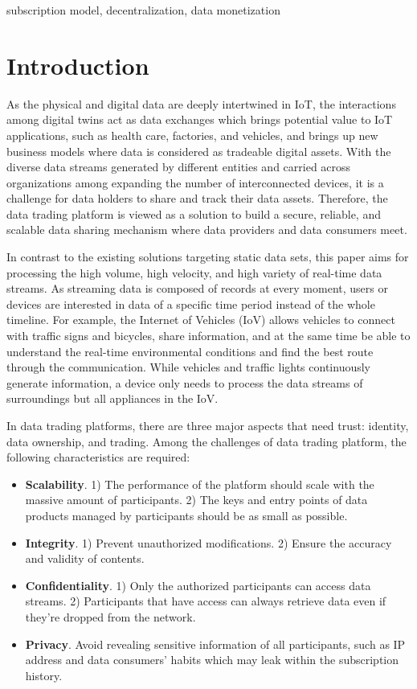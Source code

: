 \documentclass[10pt, conference, compsocconf]{IEEEtran}
\begin{document}
\begin{IEEEkeywords}
subscription model, decentralization, data monetization
\end{IEEEkeywords}

\section{Introduction}
As the physical and digital data are deeply intertwined in IoT, the interactions among digital twins act as data exchanges\cite{digitaltwin} which brings potential value to IoT applications, such as health care, factories, and vehicles, and brings up new business models where data is considered as tradeable digital assets. With the diverse data streams generated by different entities and carried across organizations among expanding the number of interconnected devices, it is a challenge for data holders to share and track their data assets. Therefore, the data trading platform is viewed as a solution to build a secure, reliable, and scalable data sharing mechanism where data providers and data consumers meet.

In contrast to the existing solutions targeting static data sets\cite{DIaas, MARSA}, this paper aims for processing the high volume, high velocity, and high variety of real-time data streams\cite{BigData}. As streaming data is composed of records at every moment, users or devices are interested in data of a specific time period instead of the whole timeline. For example, the Internet of Vehicles (IoV) allows vehicles to connect with traffic signs and bicycles, share information, and at the same time be able to understand the real-time environmental conditions and find the best route through the communication. While vehicles and traffic lights continuously generate information, a device only needs to process the data streams of surroundings but all appliances in the IoV.

In data trading platforms, there are three major aspects that need trust: identity, data ownership, and trading.
Among the challenges of data trading platform\cite{BigDataMarket}, the following characteristics are required:
\begin{itemize}
    \item \textbf{Scalability}.
1) The performance of the platform should scale with the massive amount of participants. 2) The keys and entry points of data products managed by participants should be as small as possible.
    \item \textbf{Integrity}. 1) Prevent unauthorized modifications. 2) Ensure the accuracy and validity of contents.
    \item \textbf{Confidentiality}.
1) Only the authorized participants can access data streams. 2) Participants that have access can always retrieve data even if they're dropped from the network.
    \item \textbf{Privacy}. Avoid revealing sensitive information of all participants, such as IP address and data consumers' habits which may leak within the subscription history.
\end{itemize}
\end{document}

